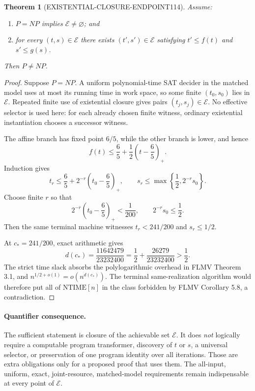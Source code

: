 \documentclass[11pt]{article}
\newtheorem{theorem}{Theorem}
\newcommand{\E}{\mathcal E}
\begin{document}
\begin{theorem}[EXISTENTIAL-CLOSURE-ENDPOINT114]
Assume:
\begin{enumerate}
\item $P=NP$ implies $\E\ne\varnothing$; and
\item for every $(t,s)\in\E$ there exists $(t',s')\in\E$ satisfying
      $t'\le f(t)$ and $s'\le g(s)$.
\end{enumerate}
Then $P\ne NP$.
\end{theorem}

\begin{proof}
Suppose $P=NP$.  A uniform polynomial-time SAT decider in the matched model
uses at most its running time in work space, so some finite $(t_0,s_0)$ lies in
$\E$.  Repeated finite use of existential closure gives pairs
$(t_j,s_j)\in\E$.  No effective selector is used here: for each already chosen
finite witness, ordinary existential instantiation chooses a successor witness.

The affine branch has fixed point $6/5$, while the other branch is lower, and
hence
\[
 f(t)\le \frac65+\frac12\left(t-\frac65\right)_+.
\]
Induction gives
\[
 t_r\le \frac65+2^{-r}\left(t_0-\frac65\right)_+,
 \qquad
 s_r\le \max\left\{\frac12,2^{-r}s_0\right\}.
\]
Choose finite $r$ so that
\[
 2^{-r}\left(t_0-\frac65\right)_+<\frac1{200},
 \qquad 2^{-r}s_0\le\frac12.
\]
Then the same terminal machine witnesses
$t_r<241/200$ and $s_r\le1/2$.

At $c_*=241/200$, exact arithmetic gives
\[
 d(c_*)=\frac{11642479}{23232400}
 =\frac12+\frac{26279}{23232400}>\frac12.
\]
The strict time slack absorbs the polylogarithmic overhead in FLMV Theorem 3.1,
and $n^{1/2+o(1)}=o(n^{d(c_*)})$.  The terminal same-realization algorithm
would therefore put all of $\mathrm{NTIME}[n]$ in the class forbidden by FLMV
Corollary 5.8, a contradiction.
\end{proof}

\paragraph{Quantifier consequence.}
The sufficient statement is closure of the achievable set $\E$.  It does
\emph{not} logically require a computable program transformer, discovery of
$t$ or $s$, a universal selector, or preservation of one program identity over
all iterations.  Those are extra obligations only for a proposed proof that
uses them.  The all-input, uniform, exact, joint-resource, matched-model
requirements remain indispensable at every point of $\E$.
\end{document}
